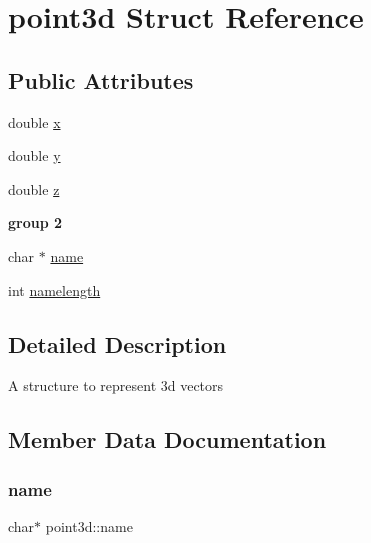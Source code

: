 \hypertarget{structpoint3d}{}\section{point3d Struct Reference}
\label{structpoint3d}
\subsection*{Public Attributes}
\textbf{ }\par
\begin{DoxyCompactItemize}
\item 
double \mbox{\hyperlink{structpoint3d_ac16dfc549efe0bd9b819ea4a9a8462a9}{x}}
\item 
double \mbox{\hyperlink{structpoint3d_af76302f192767fd9546392affbe5631c}{y}}
\item 
double \mbox{\hyperlink{structpoint3d_a96e63d7cd720242d2f79287b04a503e1}{z}}
\end{DoxyCompactItemize}

\begin{Indent}\textbf{ group 2}\par
\begin{DoxyCompactItemize}
\item 
char $\ast$ \mbox{\hyperlink{structpoint3d_afb9519af724fab8e88b239b60c864a6d}{name}}
\item 
int \mbox{\hyperlink{structpoint3d_a809caeed7433b4f182554ef12f8705a9}{namelength}}
\end{DoxyCompactItemize}
\end{Indent}


\subsection{Detailed Description}
A structure to represent 3d vectors 

\subsection{Member Data Documentation}
\mbox{\label{structpoint3d_afb9519af724fab8e88b239b60c864a6d}} 
\subsubsection{\texorpdfstring{name}{name}}
{\footnotesize\ttfamily char$\ast$ point3d\+::name}


